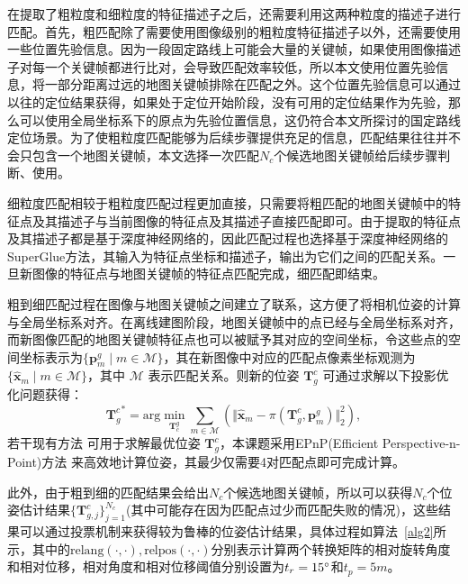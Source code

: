 在提取了粗粒度和细粒度的特征描述子之后，还需要利用这两种粒度的描述子进行匹配。首先，粗匹配除了需要使用图像级别的粗粒度特征描述子以外，还需要使用一些位置先验信息。因为一段固定路线上可能会大量的关键帧，如果使用图像描述子对每一个关键帧都进行比对，会导致匹配效率较低，所以本文使用位置先验信息，将一部分距离过远的地图关键帧排除在匹配之外。这个位置先验信息可以通过以往的定位结果获得，如果处于定位开始阶段，没有可用的定位结果作为先验，那么可以使用全局坐标系下的原点为先验位置信息，这仍符合本文所探讨的国定路线定位场景。为了使粗粒度匹配能够为后续步骤提供充足的信息，匹配结果往往并不会只包含一个地图关键帧，本文选择一次匹配$N_c$个候选地图关键帧给后续步骤判断、使用。

细粒度匹配相较于粗粒度匹配过程更加直接，只需要将粗匹配的地图关键帧中的特征点及其描述子与当前图像的特征点及其描述子直接匹配即可。由于提取的特征点及其描述子都是基于深度神经网络的，因此匹配过程也选择基于深度神经网络的SuperGlue\cite{sarlin2020superglue}方法，其输入为特征点坐标和描述子，输出为它们之间的匹配关系。一旦新图像的特征点与地图关键帧的特征点匹配完成，细匹配即结束。

粗到细匹配过程在图像与地图关键帧之间建立了联系，这方便了将相机位姿的计算与全局坐标系对齐。在离线建图阶段，地图关键帧中的点已经与全局坐标系对齐，而新图像匹配的地图关键帧特征点也可以被赋予其对应的空间坐标，令这些点的空间坐标表示为$\{\symbf{p}_m^g \mid m \in \mathcal{M}\}$，其在新图像中对应的匹配点像素坐标观测为$\{\hat{\symbf{x}}_m \mid m \in \mathcal{M}\}$，其中 $\mathcal{M}$ 表示匹配关系。则新的位姿 $\symbf{T}^{c}_g$ 可通过求解以下投影优化问题获得：
\begin{equation}
  {\symbf{T}^{c}_g}^* = \text{arg} \min_{\symbf{T}_{c}^g} \sum_{m \in \mathcal{M}} \left( \Vert \hat{\symbf{x}}_m - \pi(\symbf{T}^{c}_g, \symbf{p}_m^g) \Vert^2_2 \right),
\end{equation}
若干现有方法 \cite{lepetit2009ep, gao2003complete} 可用于求解最优位姿 $\symbf{T}^{c}_g$，本课题采用EPnP(Efficient Perspective-n-Point)方法 \cite{lepetit2009ep}来高效地计算位姿，其最少仅需要4对匹配点即可完成计算。

此外，由于粗到细的匹配结果会给出$N_c$个候选地图关键帧，所以可以获得$N_c$个位姿估计结果$\{ \symbf{T}^{c}_{g,j} \}^{N_c}_{j=1}$(其中可能存在因为匹配点过少而匹配失败的情况)，这些结果可以通过投票机制来获得较为鲁棒的位姿估计结果，具体过程如算法~\ref{alg2}所示，其中的$\text{relang}(\cdot, \cdot),\text{relpos}(\cdot, \cdot)$分别表示计算两个转换矩阵的相对旋转角度和相对位移，相对角度和相对位移阈值分别设置为$t_r=15\degree$和$t_p=5m$。

